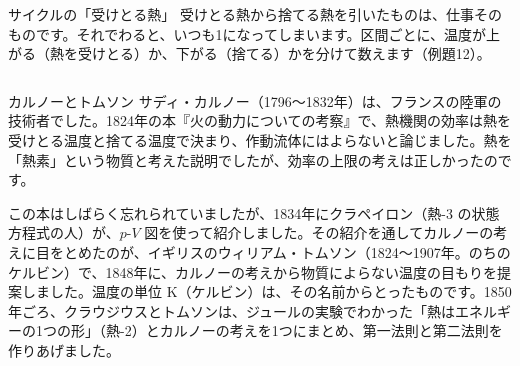 \begin{tsumazuki}{サイクルの「受けとる熱」}
受けとる熱から捨てる熱を引いたものは、仕事そのものです。それでわると、いつも1になってしまいます。区間ごとに、温度が上がる（熱を受けとる）か、下がる（捨てる）かを分けて数えます（例題12）。
\end{tsumazuki}

\begin{column}{カルノーとトムソン}
サディ・カルノー（1796〜1832年）は、フランスの陸軍の技術者でした。1824年の本『火の動力についての考察』で、熱機関の効率は熱を受けとる温度と捨てる温度で決まり、作動流体にはよらないと論じました。熱を「熱素」という物質と考えた説明でしたが、効率の上限の考えは正しかったのです。

この本はしばらく忘れられていましたが、1834年にクラペイロン（熱-3 の状態方程式の人）が、$p$-$V$ 図を使って紹介しました。その紹介を通してカルノーの考えに目をとめたのが、イギリスのウィリアム・トムソン（1824〜1907年。のちのケルビン）で、1848年に、カルノーの考えから物質によらない温度の目もりを提案しました。温度の単位 K（ケルビン）は、その名前からとったものです。1850年ごろ、クラウジウスとトムソンは、ジュールの実験でわかった「熱はエネルギーの1つの形」（熱-2）とカルノーの考えを1つにまとめ、第一法則と第二法則を作りあげました。
\end{column}


